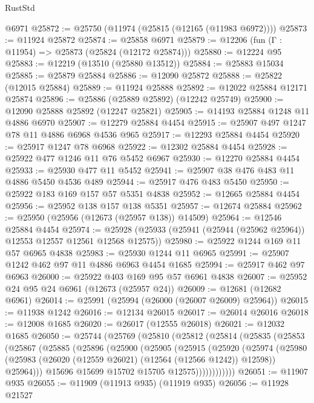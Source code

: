\begin{lexlean}{RustStd}
\begin{coremodule}
    @6971
@25872 := @25750 (@11974 (@25815 (@12165 (@11983 @6972))))
@25873 := @11924 @25872
@25874 := @25858 @6971
@25879 := @12206 (fun (Γ : @11954) => @25873 (@25824 (@12172 @25874)))
@25880 := @12224 @95
@25883 := @12219 (@13510 (@25880 @13512))
@25884 := @25883 @15034
@25885 := @25879 @25884
@25886 := @12090 @25872
@25888 := @25822 (@12015 @25884)
@25889 := @11924 @25888
@25892 := @12022 @25884 @12171 @25874
@25896 := @25886 (@25889 @25892) (@12242 @25749)
@25900 := @12090 @25888 @25892 (@12247 @25821)
@25905 := @14193 @25884 @1248 @11 @4886 @6970
@25907 := @12279 @25884 @4454
@25915 := @25907 @497 @1247 @78 @11 @4886 @6968 @4536 @965
@25917 := @12293 @25884 @4454
@25920 := @25917 @1247 @78 @6968
@25922 := @12302 @25884 @4454
@25928 := @25922 @477 @1246 @11 @76 @5452 @6967
@25930 := @12270 @25884 @4454
@25933 := @25930 @477 @11 @5452
@25941 := @25907 @38 @476 @483 @11 @4886 @5450 @4536 @489
@25944 := @25917 @476 @483 @5450
@25950 := @25922 @183 @169 @157 @57 @5351 @4838
@25952 := @12665 @25884 @4454
@25956 := @25952 @138 @157 @138 @5351
@25957 := @12674 @25884
@25962 := @25950 (@25956 (@12673 (@25957 @138)) @14509)
@25964 := @12546 @25884 @4454
@25974 := @25928 (@25933 (@25941 (@25944 (@25962 @25964)) @12553 @12557 @12561 @12568 @12575))
@25980 := @25922 @1244 @169 @11 @57 @6965 @4838
@25983 := @25930 @1244 @11 @6965
@25991 := @25907 @1242 @462 @97 @11 @4886 @6963 @4454 @1685
@25994 := @25917 @462 @97 @6963
@26000 := @25922 @403 @169 @95 @57 @6961 @4838
@26007 := @25952 @24 @95 @24 @6961 (@12673 (@25957 @24))
@26009 := @12681 (@12682 @6961)
@26014 := @25991 (@25994 (@26000 (@26007 @26009) @25964))
@26015 := @11938 @1242
@26016 := @12134 @26015
@26017 := @26014 @26016
@26018 := @12008 @1685
@26020 := @26017 (@12555 @26018)
@26021 := @12032 @1685
@26050 := @25744
    (@25769
      (@25810
        (@25812
          (@25814
            (@25835
              (@25853
                (@25867
                  (@25885
                    (@25896
                      (@25900
                        (@25905
                          (@25915
                            (@25920
                              (@25974
                                (@25980
                                  (@25983 (@26020 (@12559 @26021) (@12564 (@12566 @1242)) @12598))
                                  @25964)))
                            @15696
                            @15699
                            @15702
                            @15705
                            @12575))))))))))))
@26051 := @11907 @935
@26055 := @11909 (@11913 @935) (@11919 @935)
@26056 := @11928 @21527

\end{coremodule}
\end{lexlean}
